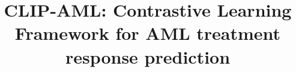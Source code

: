 \documentclass[sigconf,authordraft]{acmart}
\begin{document}
\title{CLIP-AML: Contrastive Learning Framework for AML treatment response prediction}








\end{document}
